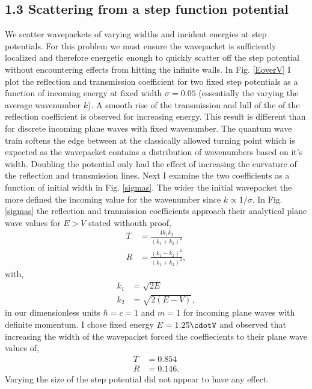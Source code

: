 \documentclass[singlepage,notitlepage,nofootinbib,11pt]{revtex4-1}
\begin{document}
\subsection*{1.3 Scattering from a step function potential}
We scatter wavepackets of varying widths and incident energies at step potentials. For this problem we must ensure the wavepacket is sufficiently localized and therefore energetic enough to quickly scatter off the step potential without encountering effects from hitting the infinite walls. In Fig. \ref{EoverV} I plot the reflection and transmission coefficient for two fixed step potentials as a function of incoming energy at fixed width $\sigma=0.05$ (essentially the varying the average wavenumber $k$). A smooth rise of the transmission and lull of the of the reflection coefficient is observed for increasing energy. This result is different than for discrete incoming plane waves with fixed wavenumber. The quantum wave train softens the edge between at the classically allowed turning point which is expected as the wavepacket contains a distribution of wavenumbers based on it's width. Doubling the potential only had the effect of increasing the curvature of the reflection and transmission lines. Next I examine the two coefficients as a function of initial width in Fig. \ref{sigmas}. The wider the initial wavepacket the more defined the incoming value for the wavenumber since $k\propto 1/\sigma$. In Fig. \ref{sigmas} the reflection and tranmission coefficients approach their analytical plane wave values for $E>V$ stated withouth proof,
\begin{align*}
T &= \frac{4 k_1 k_2 }{(k_1 + k_2)^2}\\
R &= \frac{(k_1 - k_2)^2}{(k_1+k_2)^2},
\end{align*}
with,
\begin{align*}
k_1 &= \sqrt{2E}\\
k_2 &= \sqrt{2(E-V)},
\end{align*}
in our dimensionless units $\hbar=c=1$ and $m=1$ for incoming plane waves with definite momentum. I chose fixed energy $E=1.25\cdotV$ and observed that increasing the width of the wavepacket forced the coeffiecients to their plane wave values of,
\begin{align*}
T&=0.854\\
R&=0.146.
\end{align*}
Varying the size of the step potential did not appear to have any effect.
\end{document}
